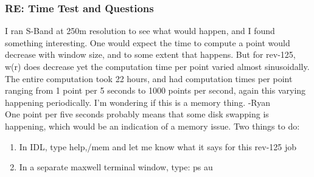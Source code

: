 \documentclass[crop=false,class=article,oneside]{standalone}
\begin{document}
\subsubsection{\footnotesize RE: Time Test and Questions}
I ran S-Band at 250m resolution to see what would happen, and I found something interesting.
One would expect the time to compute a point would decrease with window size, and to some extent that happens. But for rev-125, w(r) does decrease yet the computation time per point varied almost sinusoidally. The entire computation took 22 hours, and had computation times per point ranging from 1 point per 5 seconds to 1000 points per second, again this varying happening periodically. I'm wondering if this is a memory thing. -Ryan\\
One point per five seconds probably means that some disk swapping is happening, which would be an indication of a memory issue. Two things to do:
\begin{enumerate}
    \item In IDL, type help,/mem and let me know what it says for this rev-125 job
    \item In a separate maxwell terminal window, type: ps au
\end{enumerate}
\end{document}
